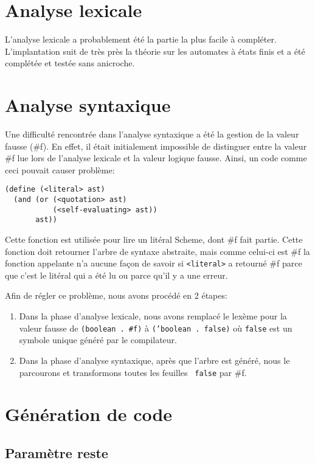 \documentclass[11pt]{report}
\begin{document}
\section{Analyse lexicale}

L'analyse lexicale a probablement été la partie la plus facile à
compléter. L'implantation suit de très près la théorie sur les
automates à états finis et a été complétée et testée sans anicroche.

\section{Analyse syntaxique}

Une difficulté rencontrée dans l'analyse syntaxique a été la gestion
de la valeur fausse (\#f).  En effet, il était initialement impossible
de distinguer entre la valeur \#f lue lors de l'analyse lexicale et la
valeur logique fausse.  Ainsi, un code comme ceci pouvait causer
problème:


\begin{verbatim}
(define (<literal> ast)
  (and (or (<quotation> ast)
           (<self-evaluating> ast))
       ast))
\end{verbatim}

Cette fonction est utilisée pour lire un litéral Scheme, dont \#f fait
partie.  Cette fonction doit retourner l'arbre de syntaxe abstraite,
mais comme celui-ci est \#f la fonction appelante n'a aucune façon de
savoir si {\tt <literal>} a retourné \#f parce que c'est le litéral
qui a été lu ou parce qu'il y a une erreur.

Afin de régler ce problème, nous avons procédé en 2 étapes:

\begin{enumerate}
\item Dans la phase d'analyse lexicale, nous avons remplacé le lexème
  pour la valeur fausse de {\tt (boolean . \#f)} à {\tt ('boolean .
    false)} où {\tt false} est un symbole unique généré par le
  compilateur.
\item Dans la phase d'analyse syntaxique, après que l'arbre est
  généré, nous le parcourons et transformons toutes les feuilles {\tt
    false} par \#f.
\end{enumerate}

\section{Génération de code}

\subsection{Paramètre reste}
\end{document}
